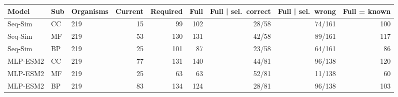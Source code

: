 \begin{tabular}{lllrrrrrr}
\toprule
Model & Sub & Organisms & Current & Required & Full & Full | sel.\ correct & Full | sel.\ wrong & Full = known \\
\midrule
Seq-Sim & CC & 219 & 15 & 99 & 102 & 28/58 & 74/161 & 100 \\
\addlinespace
Seq-Sim & MF & 219 & 53 & 130 & 131 & 42/58 & 89/161 & 117 \\
\addlinespace
Seq-Sim & BP & 219 & 25 & 101 & 87 & 23/58 & 64/161 & 86 \\
\midrule
MLP-ESM2 & CC & 219 & 77 & 131 & 140 & 44/81 & 96/138 & 120 \\
\addlinespace
MLP-ESM2 & MF & 219 & 25 & 63 & 63 & 52/81 & 11/138 & 60 \\
\addlinespace
MLP-ESM2 & BP & 219 & 83 & 134 & 124 & 28/81 & 96/138 & 103 \\
\bottomrule
\end{tabular}

